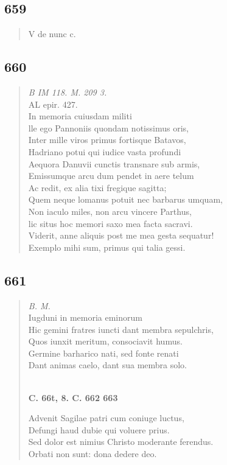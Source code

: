 \documentclass[11pt, a4paper]{report}
\begin{document}
            \subsection*{659}
      \begin{verse}
      V de nunc c. \\ 
      \end{verse}
  
            \subsection*{660}
      \begin{verse}
      \textit{B IM 118. M. 209 3.} \\ AL epir. 427. \\ In memoria cuiusdam militi \\ lle ego Pannoniis quondam notissimus oris, \\ Inter mille viros primus fortisque Batavos, \\ Hadriano potui qui iudice vasta profundi \\ Aequora Danuvii cunctis transnare sub armis, \\ Emissumque arcu dum pendet in aere telum \\ Ac redit, ex alia tixi fregique sagitta; \\ Quem neque lomanus potuit nec barbarus umquam, \\ Non iaculo miles, non arcu vincere Parthus, \\ lic situs hoc memori saxo mea facta sacravi. \\ Viderit, anne aliquis post me mea gesta sequatur! \\ Exemplo mihi sum, primus qui talia gessi. \\ 
      \end{verse}
  
            \subsection*{661}
      \begin{verse}
      \textit{B. M.} \\ Iugduni in memoria eminorum \\ Hic gemini fratres iuncti dant membra sepulchris, \\ Quos iunxit meritum, consociavit humus. \\ Germine barharico nati, sed fonte renati \\ Dant animas caelo, dant sua membra solo. \\ 
        ﻿\pagebreak 
     \marginpar{[133]} \begin{center} \textbf{C. 66t, 8. C. 662 663} \end{center}Advenit Sagilae patri cum coniuge luctus, \\ Defungi haud dubie qui voluere prius. \\ Sed dolor est nimius Christo moderante ferendus. \\ Orbati non sunt: dona dedere deo. \\ 
      \end{verse}
  
\end{document}
